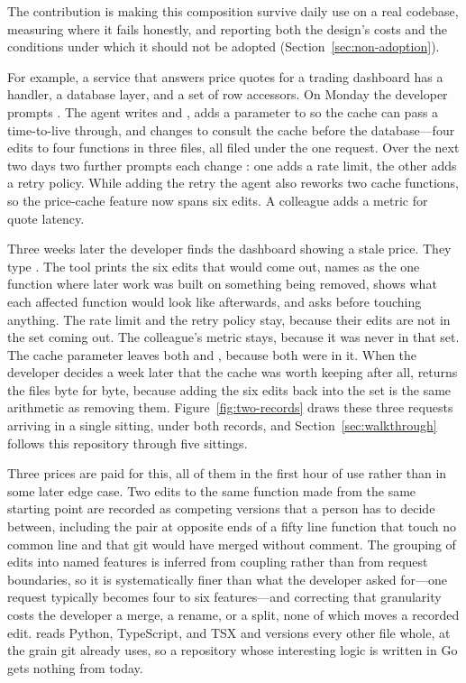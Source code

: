 \noindent The contribution is making this composition survive daily use on a real
codebase, measuring where it fails honestly, and reporting both the design's
costs and the conditions under which it should not be adopted
(Section~\ref{sec:non-adoption}).

For example, a service that answers price quotes for a trading dashboard has a
handler, a database layer, and a set of row accessors. On Monday the developer
prompts .
The agent writes  and , adds a
parameter to  so the cache can pass a time-to-live through, and
changes  to consult the cache before the database---four edits
to four functions in three files, all filed under the one request. Over the next
two days two further prompts each change : one adds a rate
limit, the other adds a retry policy. While adding the retry the agent also
reworks two cache functions, so the price-cache feature now spans six edits. A
colleague adds a metric for quote latency.

Three weeks later the developer finds the dashboard showing a stale price. They
type . The tool prints the six edits that would come
out, names  as the one function where later work was built on
something being removed, shows what each affected function would look like
afterwards, and asks before touching anything. The rate limit and the retry policy
stay, because their edits are not in the set coming out. The colleague's metric
stays, because it was never in that set. The cache parameter leaves both
 and , because both were in it. When the
developer decides a week later that the cache was worth keeping after all,
 returns the files byte for byte, because adding the six edits
back into the set is the same arithmetic as removing them.
Figure~\ref{fig:two-records} draws these three requests arriving in a single
sitting, under both records, and Section~\ref{sec:walkthrough} follows this
repository through five sittings.

Three prices are paid for this, all of them in the first hour of use rather than
in some later edge case. Two edits to the same function made from the same
starting point are recorded as competing versions that a person has to decide
between, including the pair at opposite ends of a fifty line function that touch
no common line and that git would have merged without comment. The grouping of
edits into named features is inferred from coupling rather than from request
boundaries, so it is systematically finer than what the developer asked for---one
request typically becomes four to six features---and correcting that granularity
costs the developer a merge, a rename, or a split, none of which moves a recorded
edit. \sgt{} reads Python, TypeScript, and TSX and
versions every other file whole, at the grain git already uses, so a repository
whose interesting logic is written in Go gets nothing from \sgt{} today.

